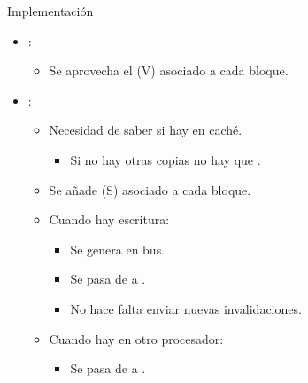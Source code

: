 \begin{frame}[t]{Implementación}
\begin{itemize}
  \item {}:
    \begin{itemize}
      \item Se aprovecha el  (V) asociado a cada bloque.
    \end{itemize}

  \item {}:
    \begin{itemize}
      \item Necesidad de saber si hay  en caché.
        \begin{itemize}
          \item Si no hay otras copias no hay que .
        \end{itemize}

      \item Se añade  (S) asociado a cada bloque.

      \item Cuando hay escritura:
        \begin{itemize}
          \item Se genera  en bus.
          \item Se pasa de  a .
          \item No hace falta enviar nuevas invalidaciones.
        \end{itemize}

      \item Cuando hay  en otro procesador:
        \begin{itemize}
          \item Se pasa de  a .
        \end{itemize}
    \end{itemize}
\end{itemize}
\end{frame}


